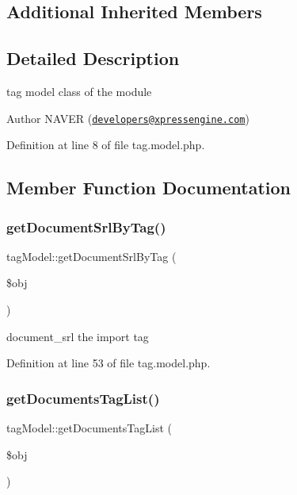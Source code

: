 \subsection*{Additional Inherited Members}


\subsection{Detailed Description}
tag model class of the module 

\begin{DoxyAuthor}{Author}
N\+A\+V\+ER (\href{mailto:developers@xpressengine.com}{\tt developers@xpressengine.\+com}) 
\end{DoxyAuthor}


Definition at line 8 of file tag.\+model.\+php.



\subsection{Member Function Documentation}
\hypertarget{classtagModel_ae4ce7b3bc2314007c44c65375d089c13}{}\label{classtagModel_ae4ce7b3bc2314007c44c65375d089c13} 
\subsubsection{\texorpdfstring{get\+Document\+Srl\+By\+Tag()}{getDocumentSrlByTag()}}
{\footnotesize\ttfamily tag\+Model\+::get\+Document\+Srl\+By\+Tag (\begin{DoxyParamCaption}\item[{}]{\$obj }\end{DoxyParamCaption})}



document\+\_\+srl the import tag 



Definition at line 53 of file tag.\+model.\+php.

\hypertarget{classtagModel_a174355a0ae69966436ad4a30f2b134e1}{}\label{classtagModel_a174355a0ae69966436ad4a30f2b134e1} 
\subsubsection{\texorpdfstring{get\+Documents\+Tag\+List()}{getDocumentsTagList()}}
{\footnotesize\ttfamily tag\+Model\+::get\+Documents\+Tag\+List (\begin{DoxyParamCaption}\item[{}]{\$obj }\end{DoxyParamCaption})}



